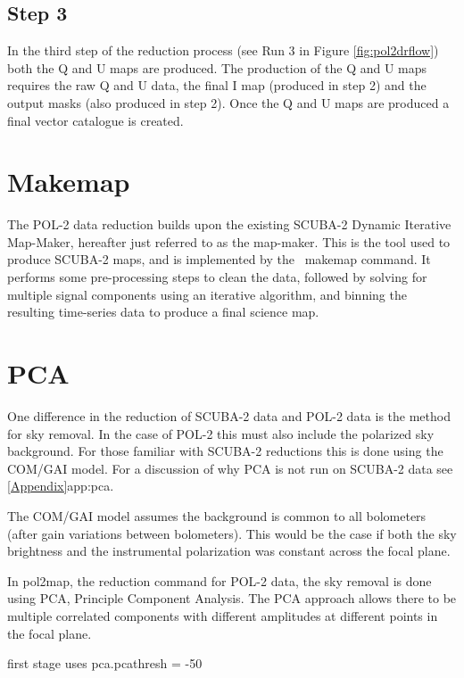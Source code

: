 \subsection*{Step 3}

In the third step of the reduction process (see Run 3 in Figure
\ref{fig:pol2drflow}) both the Q and U maps are produced. The production
of the Q and U maps requires the raw Q and U data, the final I map
(produced in step 2) and the output masks (also produced in step 2). Once
the Q and U maps are produced a final vector catalogue is created.

\section{Makemap}

The POL-2 data reduction builds upon the existing SCUBA-2 Dynamic Iterative
Map-Maker, hereafter just referred to as the map-maker. This is the tool used
to produce SCUBA-2 maps, and is implemented by
the \smurf\ makemap command. It performs some pre-processing steps to
clean the data, followed by solving for multiple signal components using
an iterative algorithm, and binning the resulting time-series data to
produce a final science map.




\section{PCA}

One difference in the reduction of SCUBA-2 data and POL-2 data is the method for sky removal.
In the case of POL-2 this must also include the polarized sky background.
For those familiar with SCUBA-2 reductions this is done using the COM/GAI model.
For a discussion of why PCA is not run on SCUBA-2 data see \cref{Appendix}{app:pca}.

The COM/GAI model assumes the background is common to all bolometers (after gain variations between bolometers). This would be the case if both the sky brightness and the instrumental polarization was constant across the focal plane.

In pol2map, the reduction command for POL-2 data, the sky removal is done using PCA, Principle Component Analysis.
The PCA approach allows there to be multiple correlated components with different amplitudes at different points in the focal plane.




first stage uses pca.pcathresh = -50


